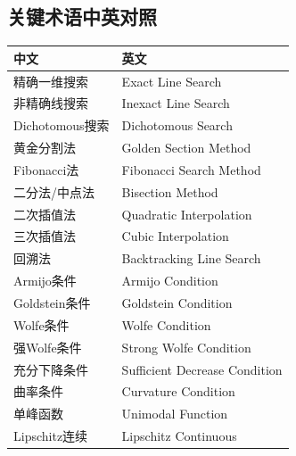 \subsection{关键术语中英对照}

\begin{table}[htbp]
\centering
\begin{tabular}{@{}ll@{}}
\toprule
\textbf{中文} & \textbf{英文} \\
\midrule
精确一维搜索 & Exact Line Search \\
非精确线搜索 & Inexact Line Search \\
Dichotomous搜索 & Dichotomous Search \\
黄金分割法 & Golden Section Method \\
Fibonacci法 & Fibonacci Search Method \\
二分法/中点法 & Bisection Method \\
二次插值法 & Quadratic Interpolation \\
三次插值法 & Cubic Interpolation \\
回溯法 & Backtracking Line Search \\
Armijo条件 & Armijo Condition \\
Goldstein条件 & Goldstein Condition \\
Wolfe条件 & Wolfe Condition \\
强Wolfe条件 & Strong Wolfe Condition \\
充分下降条件 & Sufficient Decrease Condition \\
曲率条件 & Curvature Condition \\
单峰函数 & Unimodal Function \\
Lipschitz连续 & Lipschitz Continuous \\
\bottomrule
\end{tabular}
\end{table}

\newpage



